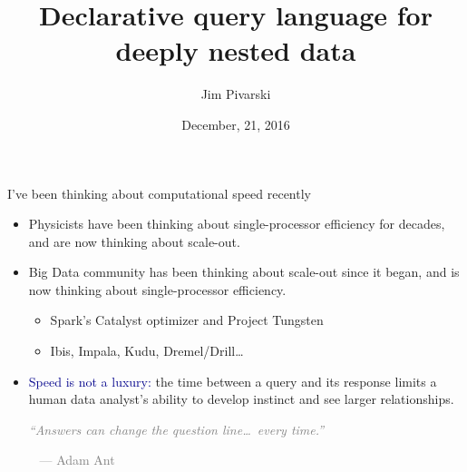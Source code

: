 \documentclass{beamer}
\title[2016-12-21-femtocode-odg]{Declarative query language for deeply nested data}
\author{Jim Pivarski}
\institute{Princeton University -- DIANA}
\date{December, 21, 2016}
\begin{document}

\begin{frame}
  \titlepage
\end{frame}




\begin{frame}{I've been thinking about computational speed recently}
\vspace{0.5 cm}
\begin{itemize}\setlength{\itemsep}{0.5 cm}
\item Physicists have been thinking about single-processor efficiency for decades, and are now thinking about scale-out.
\item Big Data community has been thinking about scale-out since it began, and is now thinking about single-processor \mbox{efficiency.\hspace{-1 cm}}
\vspace{0.25 cm}
\begin{itemize}\setlength{\itemsep}{0.1 cm}
\item Spark's Catalyst optimizer and Project Tungsten
\item Ibis, Impala, Kudu, Dremel/Drill\ldots
\end{itemize}
\item \textcolor{darkblue}{Speed is not a luxury:} the time between a query and its response limits a human data analyst's ability to develop instinct and see larger relationships.

\vspace{0.5 cm}
\textcolor{gray}{\it ``Answers can change the question line\ldots\ every time.''}

\mbox{ } \hfill \textcolor{gray}{--- Adam Ant}
\end{itemize}
\end{frame}
\end{document}
